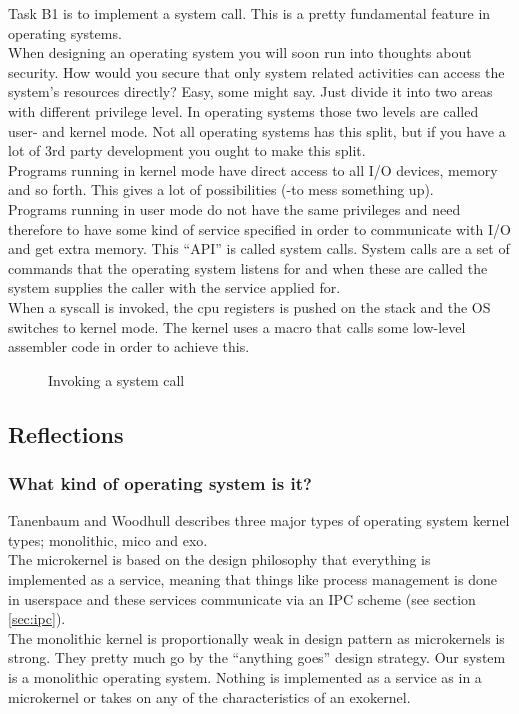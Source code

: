 Task B1 is to implement a system call. This is a pretty fundamental feature in operating systems.\\

When designing an operating system you will soon run into thoughts about security. How would you secure that only system related activities
can access the system's resources directly? Easy, some might say. Just divide it into two areas with different privilege level. 
In operating systems those two levels are called user- and kernel mode. Not all operating systems has this split, but if you have a
 lot of 3rd party development you ought to make this split.\\
Programs running in kernel mode have direct access to all I/O devices, memory and so forth. This gives a lot of possibilities (-to mess something up).\\
Programs running in user mode do not have the same privileges and need therefore to have some kind of service specified in order to communicate with I/O and get extra memory. This ``API'' is called system calls. System calls are a set of commands that the operating system listens for and when these are called the system supplies the caller with the service applied for.\\
When a syscall is invoked, the cpu registers is pushed on the stack and the OS switches to kernel mode. The kernel uses a macro that calls some low-level assembler code in order to achieve this.


\begin{figure}
\centering
{}
\caption{Invoking a system call}
\label{fig:kernel_mode}
\end{figure}

\subsection{Reflections}

\subsubsection*{What kind of operating system is it?}
Tanenbaum and Woodhull describes three major types of operating system kernel types; monolithic, mico and exo.\\
The microkernel is based on the design philosophy that everything is implemented as a service, meaning that things like process management is done
in userspace and these services communicate via an IPC scheme (see section \ref{sec:ipc}).\\
The monolithic kernel is proportionally weak in design pattern as microkernels is strong. They pretty much go by the ``anything goes'' design 
strategy. Our system is a monolithic operating system. Nothing is implemented as a service as in a microkernel or takes on any of the
characteristics of an exokernel.

